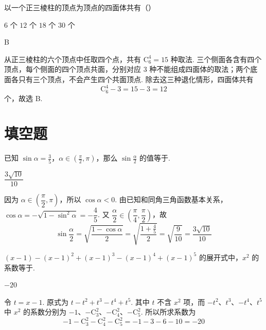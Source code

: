 \begin{problem}
以一个正三棱柱的顶点为顶点的四面体共有（\quad）

\choices
    {\(6\) 个}
    {\(12\) 个}
    {\(18\) 个}
    {\(30\) 个}
\end{problem}

\begin{answer}B\end{answer}

\begin{solution}
从正三棱柱的六个顶点中任取四个点，共有 \(\mathrm C_6^4=15\) 种取法. 三个侧面各含有四个顶点，每个侧面的四个顶点共面，分别对应 \(3\) 种不能组成四面体的取法；两个底面各只有三个顶点，不会产生四个共面顶点. 除去这三种退化情形，四面体共有
\[
\mathrm C_6^4-3=15-3=12
\]
个，故选 B.
\end{solution}

\section{填空题}

\begin{problem}
已知 \(\sin\alpha=\frac{3}{5}\)，\(\alpha\in\left( \frac{\pi}{2},\pi \right)\)，那么 \(\sin\frac{\alpha}{2}\) 的值等于\fillinblank{}.
\end{problem}

\begin{answer}\(\dfrac{3\sqrt{10}}{10}\)\end{answer}

\begin{solution}
因为 \(\alpha\in\left(\dfrac\pi2,\pi\right)\)，所以 \(\cos\alpha<0\). 由已知和同角三角函数基本关系，\(\cos\alpha=-\sqrt{1-\sin^2\alpha}=-\dfrac45\). 又 \(\dfrac\alpha2\in\left(\dfrac\pi4,\dfrac\pi2\right)\)，故
\[
\sin\frac\alpha2=\sqrt{\frac{1-\cos\alpha}{2}}=\sqrt{\frac{1+\frac{4}{5}}{2}}=\sqrt{\frac9{10}}=\frac{3\sqrt{10}}{10}
\]
\end{solution}


\begin{problem}
\((x-1)-(x-1)^2+(x-1)^3-(x-1)^4+(x-1)^5\) 的展开式中，\(x^2\) 的系数等于\fillinblank{}.
\end{problem}

\begin{answer}\(-20\)\end{answer}

\begin{solution}
令 \(t=x-1\). 原式为 \(t-t^2+t^3-t^4+t^5\). 其中 \(t\) 不含 \(x^2\) 项，而 \(-t^2\)、\(t^3\)、\(-t^4\)、\(t^5\) 中 \(x^2\) 的系数分别为 \(-1\)、\(-\mathrm C_3^2\)、\(-\mathrm C_4^2\)、\(-\mathrm C_5^2\). 所以所求系数为
\[
-1-\mathrm C_3^2-\mathrm C_4^2-\mathrm C_5^2=-1-3-6-10=-20
\]
\end{solution}


